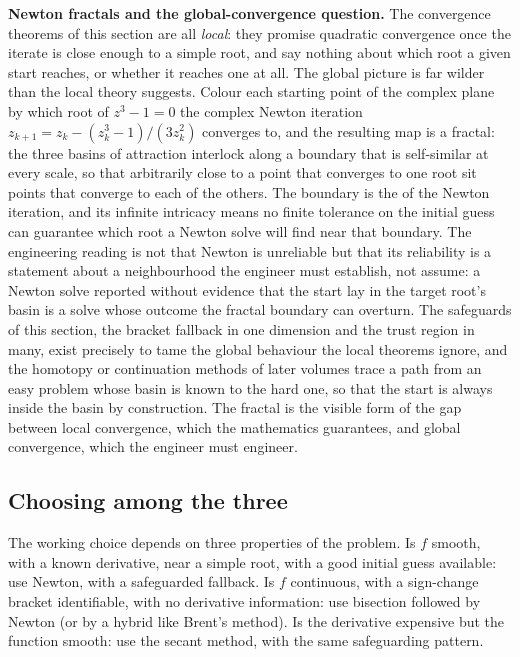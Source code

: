 \begin{mastery}
\textbf{Newton fractals and the global-convergence question.} The
convergence theorems of this section are all \emph{local}: they promise
quadratic convergence once the iterate is close enough to a simple root, and
say nothing about which root a given start reaches, or whether it reaches one
at all. The global picture is far wilder than the local theory suggests.
Colour each starting point of the complex plane by which root of $z^{3} - 1 =
0$ the complex Newton iteration $z_{k+1} = z_{k} - (z_{k}^{3} - 1)/(3
z_{k}^{2})$ converges to, and the resulting map is a fractal: the three
basins of attraction interlock along a boundary that is self-similar at every
scale, so that arbitrarily close to a point that converges to one root sit
points that converge to each of the others. The boundary is the  of the Newton iteration, and its infinite intricacy means no finite
tolerance on the initial guess can guarantee which root a Newton solve will
find near that boundary. The engineering reading is not that Newton is
unreliable but that its reliability is a statement about a neighbourhood the
engineer must establish, not assume: a Newton solve reported without evidence
that the start lay in the target root's basin is a solve whose outcome the
fractal boundary can overturn. The safeguards of this section, the bracket
fallback in one dimension and the trust region in many, exist precisely to tame
the global behaviour the local theorems ignore, and the homotopy or
continuation methods of later volumes trace a path from an easy problem whose
basin is known to the hard one, so that the start is always inside the basin
by construction. The fractal is the visible form of the gap between local
convergence, which the mathematics guarantees, and global convergence, which
the engineer must engineer.
\end{mastery}

\subsection{Choosing among the three}

The working choice depends on three properties of the problem.
Is $f$ smooth, with a known derivative, near a simple root, with
a good initial guess available: use Newton, with a safeguarded
fallback. Is $f$ continuous, with a sign-change bracket
identifiable, with no derivative information: use bisection
followed by Newton (or by a hybrid like Brent's method). Is the
derivative expensive but the function smooth: use the secant
method, with the same safeguarding pattern.

